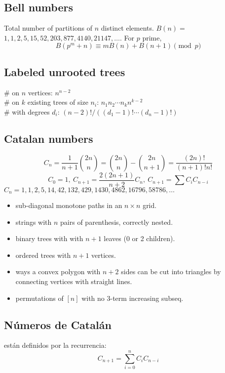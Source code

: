 	\subsection{Bell numbers}
		Total number of partitions of $n$ distinct elements. $B(n) =$
		$1, 1, 2, 5, 15, 52, 203, 877, 4140, 21147, \dots$. For $p$ prime,
		\[ B(p^m+n)\equiv mB(n)+B(n+1) \pmod{p} \]

	\subsection{Labeled unrooted trees}
		\# on $n$ vertices: $n^{n-2}$ \\
		\# on $k$ existing trees of size $n_i$: $n_1n_2\cdots n_k n^{k-2}$ \\
		\# with degrees $d_i$: $(n-2)! / ((d_1-1)! \cdots (d_n-1)!)$

	\subsection{Catalan numbers}
		\[ C_n=\frac{1}{n+1}\binom{2n}{n}= \binom{2n}{n}-\binom{2n}{n+1} = \frac{(2n)!}{(n+1)!n!} \]
		\[ C_0=1,\ C_{n+1} = \frac{2(2n+1)}{n+2}C_n,\ C_{n+1}=\sum C_iC_{n-i} \]
		${C_n = 1, 1, 2, 5, 14, 42, 132, 429, 1430, 4862, 16796, 58786, \dots}$
		\begin{itemize}[noitemsep]
			\item sub-diagonal monotone paths in an $n\times n$ grid.
			\item strings with $n$ pairs of parenthesis, correctly nested.
			\item binary trees with with $n+1$ leaves (0 or 2 children).
			\item ordered trees with $n+1$ vertices.
			\item ways a convex polygon with $n+2$ sides can be cut into triangles by connecting vertices with straight lines.
			\item permutations of $[n]$ with no 3-term increasing subseq.
		\end{itemize}

		\subsection{Números de Catal\'an} están definidos por la recurrencia:
		\begin{equation*}
		  C_{n+1} = \sum_{i=0}^nC_iC_{n-i}
		\end{equation*}
		
